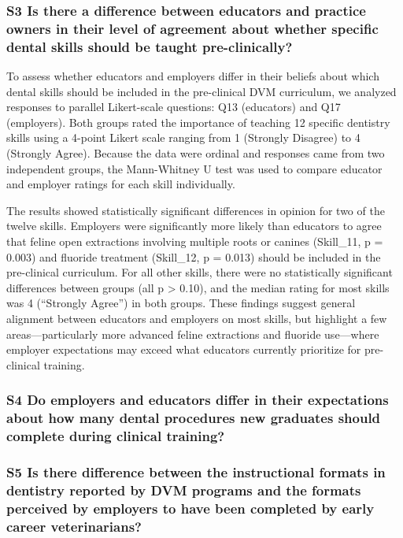 \documentclass[
  11pt,
  letterpaper,
  DIV=11,
  numbers=noendperiod]{scrartcl}
\numberwithin{figure}{section}
\begin{document}
\subsubsection{S3 Is there a difference between educators and practice
owners in their level of agreement about whether specific dental skills
should be taught
pre-clinically?}\label{s3-is-there-a-difference-between-educators-and-practice-owners-in-their-level-of-agreement-about-whether-specific-dental-skills-should-be-taught-pre-clinically}

To assess whether educators and employers differ in their beliefs about
which dental skills should be included in the pre-clinical DVM
curriculum, we analyzed responses to parallel Likert-scale questions:
Q13 (educators) and Q17 (employers). Both groups rated the importance of
teaching 12 specific dentistry skills using a 4-point Likert scale
ranging from 1 (Strongly Disagree) to 4 (Strongly Agree). Because the
data were ordinal and responses came from two independent groups, the
Mann-Whitney U test was used to compare educator and employer ratings
for each skill individually.

The results showed statistically significant differences in opinion for
two of the twelve skills. Employers were significantly more likely than
educators to agree that feline open extractions involving multiple roots
or canines (Skill\_11, p = 0.003) and fluoride treatment (Skill\_12, p =
0.013) should be included in the pre-clinical curriculum. For all other
skills, there were no statistically significant differences between
groups (all p \textgreater{} 0.10), and the median rating for most
skills was 4 (``Strongly Agree'') in both groups. These findings suggest
general alignment between educators and employers on most skills, but
highlight a few areas---particularly more advanced feline extractions
and fluoride use---where employer expectations may exceed what educators
currently prioritize for pre-clinical training.

\subsubsection{S4 Do employers and educators differ in their
expectations about how many dental procedures new graduates should
complete during clinical
training?}\label{s4-do-employers-and-educators-differ-in-their-expectations-about-how-many-dental-procedures-new-graduates-should-complete-during-clinical-training}

\subsubsection{S5 Is there difference between the instructional formats
in dentistry reported by DVM programs and the formats perceived by
employers to have been completed by early career
veterinarians?}\label{s5-is-there-difference-between-the-instructional-formats-in-dentistry-reported-by-dvm-programs-and-the-formats-perceived-by-employers-to-have-been-completed-by-early-career-veterinarians}
\end{document}
